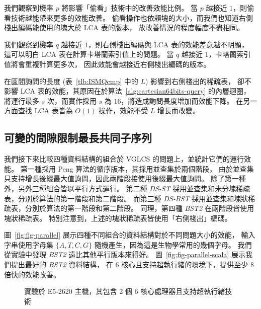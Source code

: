 

我們觀察到機率 $p$ 將影響「偷看」技術中的改善效能比例。
當 $p$ 越接近 $1$，則偷看技術越能帶來更多的效能改善。
偷看操作也依賴塊的大小，而我們也知道右側棧出編碼能使用的塊大於 LCA 表的版本，
故改善情況的程度幅度不盡相同。

我們觀察到機率 $q$ 越接近 $1$，則右側棧出編碼與 LCA 表的效能差意越不明顯，
這可以明白 LCA 表在計算卡塔蘭索引值上的問題。
當 $q$ 越接近 $1$，卡塔蘭索引值將會重複計算更多次，
因此效能會越接近右側棧出編碼的版本。

在區間詢問的長度 (表~\ref{tlb:ISMQcmp} 中的 $L$) 影響到右側棧出的稀疏表，
卻不影響 LCA 表的效能，其原因在於算法~\ref{alg:cartesian64bits-query} 的內層迴圈，
將運行最多 $s$ 次，而實作採用 $s$ 為 $16$，將造成詢問長度增加而效能下降。
在另一方面查找 LCA 表皆為 $O(1)$ 操作，效能不受 $L$ 增長而改變。

\subsection{可變的間隙限制最長共同子序列}

我們接下來比較四種資料結構的組合於 VGLCS 的問題上，並統計它們的運行效能。
第一種採用 Peng 算法的循序版本，其採用並查集於兩個階段，
由於並查集只支持增長後綴最大值詢問，因此兩階段接使用後綴最大值詢問。
除了第一種外，另外三種組合皆以平行方式運行。
第二種 {\em DS-ST} 採用並查集和未分塊稀疏表，分別於算法的第一階段和第二階段。
而第三種 {\em DS-BST} 採用並查集和塊狀稀疏表，分別於算法的第一階段和第二階段。
同理，第四種 {\em BST2} 在兩階段皆使用塊狀稀疏表。
特別注意到，上述的塊狀稀疏表皆使用「右側棧出」編碼。

圖~\ref{fig:fig-parallel} 展示四種不同組合的資料結構對於不同問題大小的效能，
輸入字串使用字母集 $\{A, T, C, G\}$ 隨機產生，因為這是生物學常用的幾個字母。
我們從實驗中發現 {\em BST2} 遠比其他平行版本來得好。
圖~\ref{fig:fig-parallel-scala} 展示我們提出最好的 {\em BST2} 資料結構，
在 6 核心且支持超執行緒的環境下，提供至少 8 倍快的效能改善。

\begin{figure}[!thb]
  \centering
  \caption{實驗於 E5-2620 主機，其包含 2 個 6 核心處理器且支持超執行緒技術}
\end{figure}
